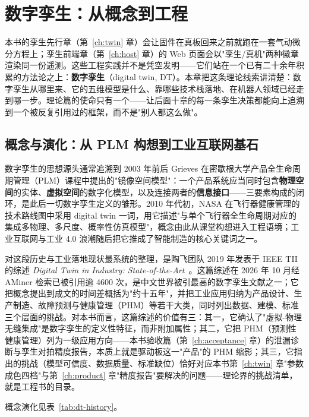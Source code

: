 \chapter{数字孪生：从概念到工程}
\label{ch:dt-theory}

本书的孪生先行章（第~\ref{ch:twin} 章）会让固件在真板回来之前就跑在一套气动微分方程上；孪生前端章（第~\ref{ch:host} 章）的 Web 页面会以"孪生/真机"两种徽章渲染同一份遥测。这些工程实践并不是凭空发明——它们站在一个已有二十余年积累的方法论之上：\textbf{数字孪生}（digital twin, DT）。本章把这条理论线索讲清楚：数字孪生从哪里来、它的五维模型是什么、靠哪些技术栈落地、在机器人领域已经走到哪一步。理论篇的使命只有一个——让后面十章的每一条孪生决策都能向上追溯到一个被反复引用过的框架，而不是"别人都这么做"。

\section{概念与演化：从 PLM 构想到工业互联网基石}
\label{sec:dt-history}

数字孪生的思想源头通常追溯到 2003 年前后 Grieves 在密歇根大学产品全生命周期管理（PLM）课程中提出的"镜像空间模型"：一个产品系统应当同时包含\textbf{物理空间}的实体、\textbf{虚拟空间}的数字化模型，以及连接两者的\textbf{信息接口}——三要素构成的闭环，是此后一切数字孪生定义的雏形。2010 年代初，NASA 在飞行器健康管理的技术路线图中采用 digital twin 一词，用它描述"与单个飞行器全生命周期对应的集成多物理、多尺度、概率性仿真模型"，概念由此从课堂构想进入工程语境；工业互联网与工业 4.0 浪潮随后把它推成了智能制造的核心关键词之一。

对这段历史与工业落地现状最系统的整理，是陶飞团队 2019 年发表于 IEEE TII 的综述 \emph{Digital Twin in Industry: State-of-the-Art}~\cite{Tao2019}。这篇综述在 2026 年 10 月经 AMiner 检索已被引用逾 4600 次，是中文世界被引最高的数字孪生文献之一；它把概念提出到成文的时间差概括为"约十五年"，并把工业应用归纳为产品设计、生产制造、故障预测与健康管理（PHM）等若干大类，同时列出数据、建模、标准三个层面的挑战。对本书而言，这篇综述的价值有三：其一，它确认了"虚拟-物理无缝集成"是数字孪生的定义性特征，而非附加属性；其二，它把 PHM（预测性健康管理）列为一级应用方向——本书验收篇（第~\ref{ch:acceptance} 章）的泄漏诊断与孪生对拍精度报告，本质上就是驱动板这一"产品"的 PHM 缩影；其三，它指出的挑战（模型可信度、数据质量、标准缺位）恰好对应本书第~\ref{ch:twin} 章"参数成色四档"与第~\ref{ch:product} 章"精度报告"要解决的问题——理论界的挑战清单，就是工程书的目录。

概念演化见表~\ref{tab:dt-history}。

